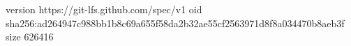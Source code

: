 version https://git-lfs.github.com/spec/v1
oid sha256:ad264947c988bb1b8c69a655f58da2b32ae55cf2563971d8f8a034470b8aeb3f
size 626416
